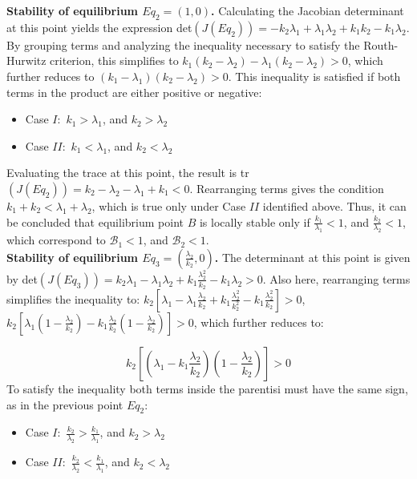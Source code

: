 \noindent\textbf{Stability of equilibrium $Eq_2=(1,0)$.} Calculating the Jacobian determinant at this point yields the expression det$(J(Eq_2))= - k_2 \lambda_1 + \lambda_1 \lambda_2 + k_1 k_2 - k_1 \lambda_2$. By grouping terms and analyzing the inequality necessary to satisfy the Routh-Hurwitz criterion, this simplifies to $k_1 (k_2 - \lambda_2) - \lambda_1(k_2 - \lambda_2) > 0$, which further reduces to $(k_1 - \lambda_1) (k_2 - \lambda_2) >0$.
This inequality is satisfied if both terms in the product are either positive or negative:
\begin{itemize}
	\item Case $I:$ $k_1 > \lambda_1$, and $k_2 > \lambda_2$
	\item Case $II:$ $k_1 < \lambda_1$, and $k_2 < \lambda_2$
\end{itemize}
Evaluating the trace at this point, the result is tr$(J(Eq_2)) = k_2 - \lambda_2 - \lambda_1 + k_1 < 0 $. Rearranging terms gives the condition $k_1 + k_2 < \lambda_1 + \lambda_2$, which is true only under Case $II$ identified above. 
Thus, it can be concluded that equilibrium point $B$ is locally stable only if $\frac{k_1}{\lambda_1} <1$, and  $\frac{k_2}{\lambda_2} <1$, which correspond to $\mathcal{B}_1 < 1$, and $\mathcal{B}_2 <1$.\\

\noindent\textbf{Stability of equilibrium $Eq_3=(\frac{\lambda_2}{k_2},0)$.} The determinant at this point is given by det$(J(Eq_3)) = k_2 \lambda_1 - \lambda_1 \lambda_2 + k_1 \frac{\lambda_2^2}{k_2} - k_1 \lambda_2 > 0 $. Also here, rearranging terms simplifies the inequality to: $k_2 [\lambda_1 -\lambda_1 \frac{\lambda_2}{k_2} + k_1 \frac{\lambda_2^2}{k_2^2} - k_1 \frac{\lambda_2^2}{k_2}] >0$, $ k_2 [\lambda_1 ( 1 -  \frac{\lambda_2}{k_2}) - k_1 \frac{\lambda_2}{k_2} (1 - \frac{\lambda_2}{k_2})] >0$, which further reduces to:

\[
 k_2 \left[\left(\lambda_1 - k_1 \frac{\lambda_2}{k_2}\right)\left(1 - \frac{\lambda_2}{k_2}\right)\right] >0
\]
To satisfy the inequality both terms inside the parentisi must have the same sign, as in the previous point $Eq_2$:
\begin{itemize}
	\item Case $I:$ $\frac{k_2}{\lambda_2} > \frac{k_1}{\lambda_1} $, and $k_2 > \lambda_2$
 	\item Case $II:$ $\frac{k_2}{\lambda_2} < \frac{k_1}{\lambda_1} $, and $k_2 < \lambda_2$
\end{itemize}

